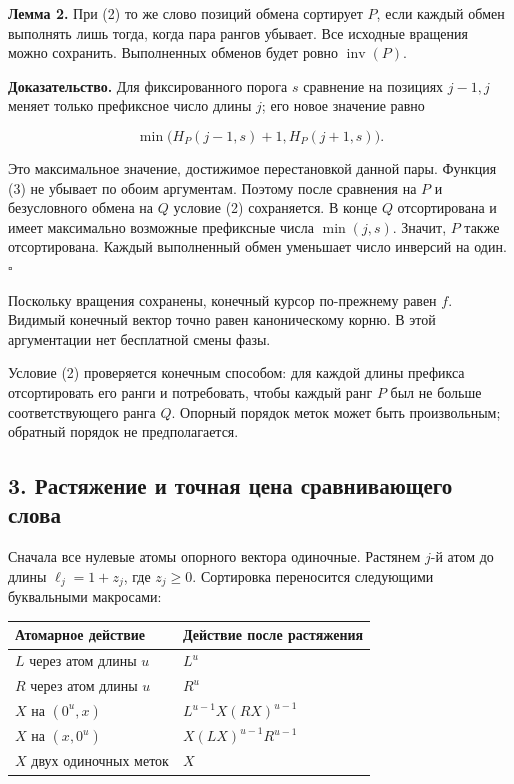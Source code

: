 \documentclass[
  11pt,
  a4paper,
]{article}
\begin{document}
\textbf{Лемма 2.} При (2) то же слово позиций обмена сортирует \(P\),
если каждый обмен выполнять лишь тогда, когда пара рангов убывает. Все
исходные вращения можно сохранить. Выполненных обменов будет ровно
\(\operatorname{inv}(P)\).

\textbf{Доказательство.} Для фиксированного порога \(s\) сравнение на
позициях \(j-1,j\) меняет только префиксное число длины \(j\); его новое
значение равно

\[\min\bigl(H_P(j-1,s)+1,H_P(j+1,s)\bigr).\tag{3}\]

Это максимальное значение, достижимое перестановкой данной пары. Функция
(3) не убывает по обоим аргументам. Поэтому после сравнения на \(P\) и
безусловного обмена на \(Q\) условие (2) сохраняется. В конце \(Q\)
отсортирована и имеет максимально возможные префиксные числа
\(\min(j,s)\). Значит, \(P\) также отсортирована. Каждый выполненный
обмен уменьшает число инверсий на один. \(\square\)

Поскольку вращения сохранены, конечный курсор по-прежнему равен \(f\).
Видимый конечный вектор точно равен каноническому корню. В этой
аргументации нет бесплатной смены фазы.

Условие (2) проверяется конечным способом: для каждой длины префикса
отсортировать его ранги и потребовать, чтобы каждый ранг \(P\) был не
больше соответствующего ранга \(Q\). Опорный порядок меток может быть
произвольным; обратный порядок не предполагается.

\hypertarget{ux440ux430ux441ux442ux44fux436ux435ux43dux438ux435-ux438-ux442ux43eux447ux43dux430ux44f-ux446ux435ux43dux430-ux441ux440ux430ux432ux43dux438ux432ux430ux44eux449ux435ux433ux43e-ux441ux43bux43eux432ux430}{%
\subsection{3. Растяжение и точная цена сравнивающего
слова}\label{ux440ux430ux441ux442ux44fux436ux435ux43dux438ux435-ux438-ux442ux43eux447ux43dux430ux44f-ux446ux435ux43dux430-ux441ux440ux430ux432ux43dux438ux432ux430ux44eux449ux435ux433ux43e-ux441ux43bux43eux432ux430}}

Сначала все нулевые атомы опорного вектора одиночные. Растянем \(j\)-й
атом до длины \(\ell_j=1+z_j\), где \(z_j\ge0\). Сортировка переносится
следующими буквальными макросами:

\begin{longtable}[]{@{}ll@{}}
\toprule\noalign{}
Атомарное действие & Действие после растяжения \\
\midrule\noalign{}
\endhead
\bottomrule\noalign{}
\endlastfoot
\(L\) через атом длины \(u\) & \(L^u\) \\
\(R\) через атом длины \(u\) & \(R^u\) \\
\(X\) на \((0^u,x)\) & \(L^{u-1}X(RX)^{u-1}\) \\
\(X\) на \((x,0^u)\) & \(X(LX)^{u-1}R^{u-1}\) \\
\(X\) двух одиночных меток & \(X\) \\
\end{longtable}
\end{document}
